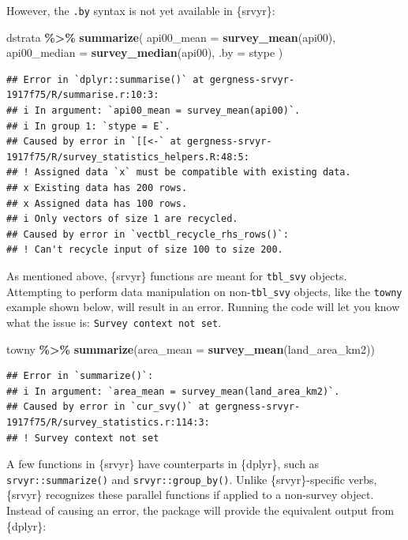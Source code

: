 \documentclass[
]{krantz}
\makeatletter
\newenvironment{Shaded}{\begin{snugshade}}{\end{snugshade}}
\newcommand{\AttributeTok}[1]{\textcolor[rgb]{0.27,0.27,0.27}{#1}}
\newcommand{\FunctionTok}[1]{\textcolor[rgb]{0.27,0.27,0.27}{\textbf{#1}}}
\newcommand{\NormalTok}[1]{#1}
\newcommand{\SpecialCharTok}[1]{\textcolor[rgb]{0.43,0.43,0.43}{\textbf{#1}}}
\newenvironment{kframe}{%
\medskip{}
\setlength{\fboxsep}{.8em}
 \def\at@end@of@kframe{}%
 \ifinner\ifhmode%
  \def\at@end@of@kframe{\end{minipage}}%
  \begin{minipage}{\columnwidth}%
 \fi\fi%
 \def\FrameCommand##1{\hskip\@totalleftmargin \hskip-\fboxsep
 \colorbox{shadecolor}{##1}\hskip-\fboxsep
     \hskip-\linewidth \hskip-\@totalleftmargin \hskip\columnwidth}%
 \MakeFramed {\advance\hsize-\width
   \@totalleftmargin\z@ \linewidth\hsize
   \@setminipage}}%
 {\par\unskip\endMakeFramed%
 \at@end@of@kframe}
\renewenvironment{Shaded}{\begin{kframe}}{\end{kframe}}
\makeatother
\begin{document}
However, the \texttt{.by} syntax is not yet available in \{srvyr\}:

\begin{Shaded}
\begin{Highlighting}[]
\NormalTok{dstrata }\SpecialCharTok{\%\textgreater{}\%}
  \FunctionTok{summarize}\NormalTok{(}
    \AttributeTok{api00\_mean =} \FunctionTok{survey\_mean}\NormalTok{(api00),}
    \AttributeTok{api00\_median =} \FunctionTok{survey\_median}\NormalTok{(api00),}
    \AttributeTok{.by =}\NormalTok{ stype}
\NormalTok{  )}
\end{Highlighting}
\end{Shaded}

\begin{verbatim}
## Error in `dplyr::summarise()` at gergness-srvyr-1917f75/R/summarise.r:10:3:
## i In argument: `api00_mean = survey_mean(api00)`.
## i In group 1: `stype = E`.
## Caused by error in `[[<-` at gergness-srvyr-1917f75/R/survey_statistics_helpers.R:48:5:
## ! Assigned data `x` must be compatible with existing data.
## x Existing data has 200 rows.
## x Assigned data has 100 rows.
## i Only vectors of size 1 are recycled.
## Caused by error in `vectbl_recycle_rhs_rows()`:
## ! Can't recycle input of size 100 to size 200.
\end{verbatim}

As mentioned above, \{srvyr\} functions are meant for \texttt{tbl\_svy} objects. Attempting to perform data manipulation on non-\texttt{tbl\_svy} objects, like the \texttt{towny} example shown below, will result in an error. Running the code will let you know what the issue is: \texttt{Survey\ context\ not\ set}.

\begin{Shaded}
\begin{Highlighting}[]
\NormalTok{towny }\SpecialCharTok{\%\textgreater{}\%}
  \FunctionTok{summarize}\NormalTok{(}\AttributeTok{area\_mean =} \FunctionTok{survey\_mean}\NormalTok{(land\_area\_km2))}
\end{Highlighting}
\end{Shaded}

\begin{verbatim}
## Error in `summarize()`:
## i In argument: `area_mean = survey_mean(land_area_km2)`.
## Caused by error in `cur_svy()` at gergness-srvyr-1917f75/R/survey_statistics.r:114:3:
## ! Survey context not set
\end{verbatim}

A few functions in \{srvyr\} have counterparts in \{dplyr\}, such as \texttt{srvyr::summarize()} and \texttt{srvyr::group\_by()}. Unlike \{srvyr\}-specific verbs, \{srvyr\} recognizes these parallel functions if applied to a non-survey object. Instead of causing an error, the package will provide the equivalent output from \{dplyr\}:
\end{document}
